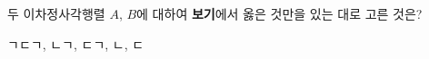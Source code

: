 \hspace*{2mm}\begin{minipage}[t]{\dimexpr\linewidth-2mm\relax}\vspace{0pt}
두 이차정사각행렬 $A$, $B$에 대하여 \textbf{보기}에서 옳은 것만을 있는 대로 고른 것은?  
\begin{choices32}{ㄱ}{ㄷ}{ㄱ, ㄴ}{ㄱ, ㄷ}{ㄱ, ㄴ, ㄷ}\end{choices32}\end{minipage}
